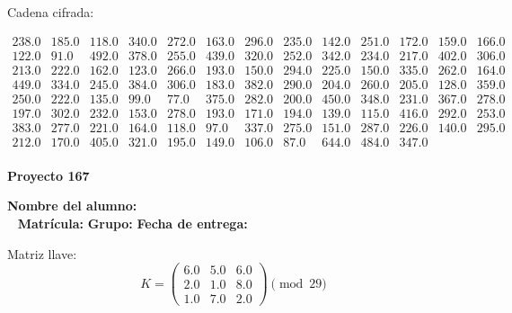 \documentclass[12pt]{article}
\begin{document}
Cadena cifrada:
\begin{center}
$\begin{array}{lllllllllllll}
238.0 & 185.0 & 118.0 & 340.0 & 272.0 & 163.0 & 296.0 & 235.0 & 142.0 & 251.0 & 172.0 & 159.0 & 166.0\\
122.0 & 91.0 & 492.0 & 378.0 & 255.0 & 439.0 & 320.0 & 252.0 & 342.0 & 234.0 & 217.0 & 402.0 & 306.0\\
213.0 & 222.0 & 162.0 & 123.0 & 266.0 & 193.0 & 150.0 & 294.0 & 225.0 & 150.0 & 335.0 & 262.0 & 164.0\\
449.0 & 334.0 & 245.0 & 384.0 & 306.0 & 183.0 & 382.0 & 290.0 & 204.0 & 260.0 & 205.0 & 128.0 & 359.0\\
250.0 & 222.0 & 135.0 & 99.0 & 77.0 & 375.0 & 282.0 & 200.0 & 450.0 & 348.0 & 231.0 & 367.0 & 278.0\\
197.0 & 302.0 & 232.0 & 153.0 & 278.0 & 193.0 & 171.0 & 194.0 & 139.0 & 115.0 & 416.0 & 292.0 & 253.0\\
383.0 & 277.0 & 221.0 & 164.0 & 118.0 & 97.0 & 337.0 & 275.0 & 151.0 & 287.0 & 226.0 & 140.0 & 295.0\\
212.0 & 170.0 & 405.0 & 321.0 & 195.0 & 149.0 & 106.0 & 87.0 & 644.0 & 484.0 & 347.0\\
\end{array}$
\end{center}

\newpage


\textbf{Proyecto 167}

\textbf{Nombre del alumno:} \underline{\hspace{13cm}}\\\
\vspace{1cm}
\textbf{Matrícula:} \underline{\hspace{4cm}} \hspace{1cm}
\textbf{Grupo:} \underline{\hspace{2cm}}
\textbf{Fecha de entrega:} \underline{\hspace{2cm}}

\medskip

Matriz llave:
\[
K = \begin{pmatrix}
6.0 & 5.0 & 6.0\\
2.0 & 1.0 & 8.0\\
1.0 & 7.0 & 2.0
\end{pmatrix} \pmod{29}
\]
\end{document}
